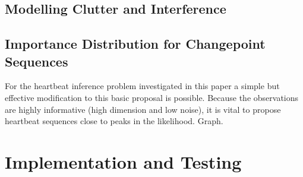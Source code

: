\documentclass{article}
\begin{document}
\subsection{Modelling Clutter and Interference}

\subsection{Importance Distribution for Changepoint Sequences}

For the heartbeat inference problem investigated in this paper a simple but effective modification to this basic proposal is possible. Because the observations are highly informative (high dimension and low noise), it is vital to propose heartbeat sequences close to peaks in the likelihood. {\meta Graph.}





\section{Implementation and Testing}




\end{document}
